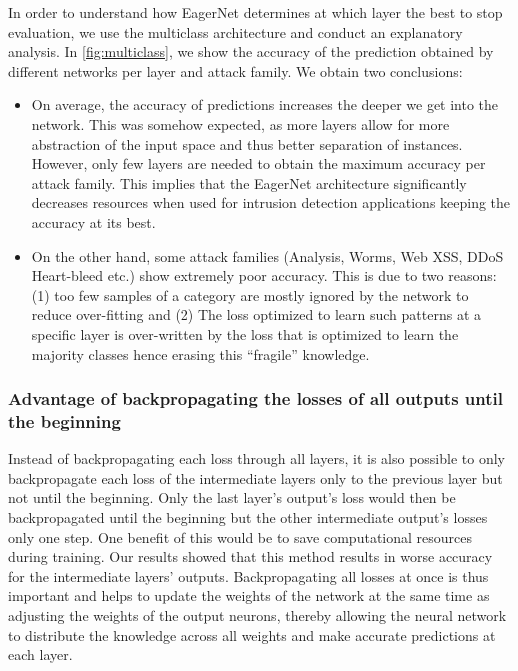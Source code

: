 \documentclass[conference]{IEEEtran}
\newcommand{\mynote}[3]{
    \fbox{\bfseries\sffamily\scriptsize#1}
    {\small$\blacktriangleright$\textsf{\emph{\color{#3}{#2}}}$\blacktriangleleft$}}
\newcommand{\todo}[1]{\mynote{TODO}{#1}{red}}
\begin{document}
In order to understand how EagerNet determines at which layer the best to stop evaluation, we use the multiclass architecture and conduct an explanatory analysis. In \autoref{fig:multiclass}, we show the accuracy of the prediction obtained by different networks per layer and attack family. We obtain two conclusions:
\begin{itemize}
\item  On average, the accuracy of predictions increases the deeper we get into the network. This was somehow expected, as more layers allow for more abstraction of the input space and thus better separation of instances. However, only few layers are needed to obtain the maximum accuracy per attack family. This implies that the EagerNet architecture significantly decreases resources when used for intrusion detection applications keeping the accuracy at its best.
\item  On the other hand, some attack families (Analysis, Worms, Web XSS, DDoS Heart-bleed etc.) show extremely poor accuracy. This is due to two reasons: (1) too few samples of a category are mostly ignored by the network to reduce over-fitting and (2) The loss optimized to learn such patterns at a specific layer is over-written by the loss that is optimized to learn the majority classes hence erasing this ``fragile'' knowledge.
\end{itemize}





\subsubsection{Advantage of backpropagating the losses of all outputs until the beginning}

Instead of backpropagating each loss through all layers, it is also possible to only backpropagate each loss of the intermediate layers only to the previous layer but not until the beginning. Only the last layer's output's loss would then be backpropagated until the beginning but the other intermediate output's losses only one step. One benefit of this would be to save computational resources during training. Our results showed that this method results in worse accuracy for the intermediate layers' outputs. Backpropagating all losses at once is thus important and helps to update the weights of the network at the same time as adjusting the weights of the output neurons, thereby allowing the neural network to distribute the knowledge across all weights and make accurate predictions at each layer.
\end{document}
